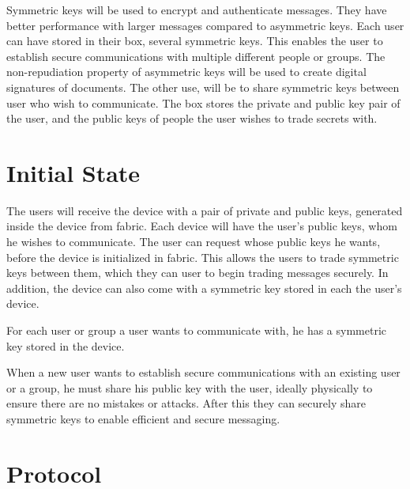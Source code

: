 \cleardoublepage
\label{chap:solution}

Symmetric keys will be used to encrypt and authenticate messages. They have better performance with larger messages compared to asymmetric keys. Each user can have stored in their box, several symmetric keys. This enables the user to establish secure communications with multiple different people or groups.
The non-repudiation property of asymmetric keys will be used to create digital signatures of documents. The other use, will be to share symmetric keys between user who wish to communicate. The box stores the private and public key pair of the user, and the public keys of people the user wishes to trade secrets with.

\section{Initial State} \label{chap:sol:initial-state}

The users will receive the device with a pair of private and public keys, generated inside the device from fabric. Each device will have the user's public keys, whom he wishes to communicate. The user can request whose public keys he wants, before the device is initialized in fabric. This allows the users to trade symmetric keys between them, which they can user to begin trading messages securely. In addition, the device can also come with a symmetric key stored in each the user's device.

For each user or group a user wants to communicate with, he has a symmetric key stored in the device.

When a new user wants to establish secure communications with an existing user or a group, he must share his public key with the user, ideally physically to ensure there are no mistakes or attacks. After this they can securely share symmetric keys to enable efficient and secure messaging.

\section{Protocol} \label{chap:sol:protocol}

